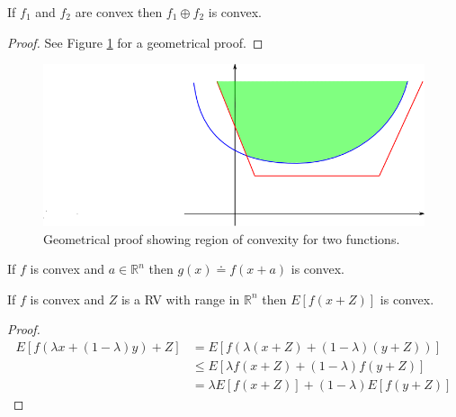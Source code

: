 \documentclass[lecture,12pt,]{pcms-l}
\theoremstyle{example}
\begin{document}
\begin{theorem}
\label{th:maxconvex}
If $f_1$ and $f_2$ are convex then $f_1\oplus f_2$ is convex.
\end{theorem}

\begin{proof}
See Figure \ref{fig:05convexOplusProof} for a geometrical proof.
\end{proof}

\begin{figure}[ht!]
	\centering
	\includegraphics[width=.4\textwidth]{images/05convexOplusProof}
	\caption{Geometrical proof showing region of convexity for two functions.}
	\label{fig:05convexOplusProof}
\end{figure}

\begin{theorem}
\label{th:argconvex}
If $f$ is convex and $a\in\mathbb{R}^n$ then $g(x)\doteq f(x+a)$ is convex.
\end{theorem}

\begin{theorem}
\label{th:randconvex}
If $f$ is convex and $Z$ is a RV with range in $\mathbb{R}^n$ then $E[f(x+Z)]$ is convex.
\end{theorem}

\begin{proof}
\begin{align*}
E[f(\lambda x+(1-\lambda)y) + Z] &= E[f(\lambda(x+Z) + (1-\lambda)(y+Z))] \\
&\leq E[\lambda f(x+Z) + (1-\lambda)f(y+Z)] \\
&= \lambda E[f(x+Z)] + (1-\lambda)E[f(y+Z)]
\end{align*}
\end{proof}
\end{document}
